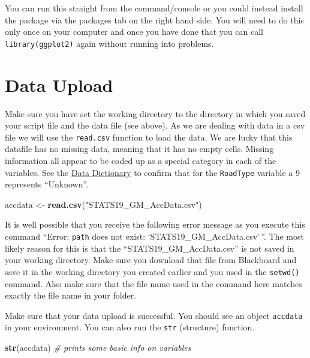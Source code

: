 \documentclass[
]{article}
\newenvironment{Shaded}{\begin{snugshade}}{\end{snugshade}}
\newcommand{\CommentTok}[1]{\textcolor[rgb]{0.56,0.35,0.01}{\textit{#1}}}
\newcommand{\FunctionTok}[1]{\textcolor[rgb]{0.13,0.29,0.53}{\textbf{#1}}}
\newcommand{\NormalTok}[1]{#1}
\newcommand{\OtherTok}[1]{\textcolor[rgb]{0.56,0.35,0.01}{#1}}
\newcommand{\StringTok}[1]{\textcolor[rgb]{0.31,0.60,0.02}{#1}}
\begin{document}
You can run this straight from the command/console or you could instead
install the package via the packages tab on the right hand side. You
will need to do this only once on your computer and once you have done
that you can call \texttt{library(ggplot2)} again without running into
problems.

\hypertarget{data-upload}{%
\section{Data Upload}\label{data-upload}}

Make sure you have set the working directory to the directory in which
you saved your script file and the data file (see above). As we are
dealing with data in a csv file we will use the \texttt{read.csv}
function to load the data. We are lucky that this datafile has no
missing data, meaning that it has no empty cells. Missing information
all appear to be coded up as a special category in each of the
variables. See the
\href{https://assets.publishing.service.gov.uk/government/uploads/system/uploads/attachment_data/file/995422/stats19.pdf}{Data
Dictionary} to confirm that for the \texttt{RoadType} variable a 9
represents ``Unknown''.

\begin{Shaded}
\begin{Highlighting}[]
\NormalTok{accdata }\OtherTok{\textless{}{-}} \FunctionTok{read.csv}\NormalTok{(}\StringTok{"STATS19\_GM\_AccData.csv"}\NormalTok{)}
\end{Highlighting}
\end{Shaded}

It is well possible that you receive the following error message as you
execute this command ``Error: \texttt{path} does not exist:
`STATS19\_GM\_AccData.csv'\,''. The most likely reason for this is that
the ``STATS19\_GM\_AccData.csv'' is not saved in your working directory.
Make sure you download that file from Blackboard and save it in the
working directory you created earlier and you used in the
\texttt{setwd()} command. Also make sure that the file name used in the
command here matches exactly the file name in your folder.

Make sure that your data upload is successful. You should see an object
\texttt{accdata} in your environment. You can also run the \texttt{str}
(structure) function.

\begin{Shaded}
\begin{Highlighting}[]
\FunctionTok{str}\NormalTok{(accdata)  }\CommentTok{\# prints some basic info on variables}
\end{Highlighting}
\end{Shaded}
\end{document}
